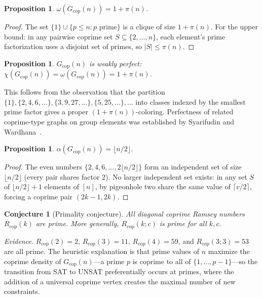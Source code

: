 \documentclass[11pt]{article}
\theoremstyle{plain}
\newtheorem{proposition}[theorem]{Proposition}
\newtheorem{conjecture}[theorem]{Conjecture}
\theoremstyle{definition}
\newcommand{\Rcop}{R_{\mathrm{cop}}}
\newcommand{\Gcop}{G_{\mathrm{cop}}}
\begin{document}
\begin{proposition}\label{prop:clique}
$\omega(\Gcop(n))=1+\pi(n)$.
\end{proposition}

\begin{proof}
The set $\{1\}\cup\{p\le n:p\text{ prime}\}$ is a clique of size
$1+\pi(n)$. For the upper bound: in any pairwise coprime set
$S\subseteq\{2,\ldots,n\}$, each element's prime factorization uses a
disjoint set of primes, so $|S|\le\pi(n)$.
\end{proof}

\begin{proposition}\label{prop:perfect}
$\Gcop(n)$ is weakly perfect: $\chi(\Gcop(n))=\omega(\Gcop(n))
=1+\pi(n)$.
\end{proposition}

This follows from the observation that the partition
$\{1\},\{2,4,6,\ldots\},\{3,9,27,\ldots\},\{5,25,\ldots\},\ldots$
into classes indexed by the smallest prime factor gives a proper
$(1+\pi(n))$-coloring. Perfectness of related coprime-type graphs on
group elements was established by Syarifudin and
Wardhana~\cite{syarifudin2021}.

\begin{proposition}\label{prop:independence}
$\alpha(\Gcop(n))=\lfloor n/2\rfloor$.
\end{proposition}

\begin{proof}
The even numbers $\{2,4,6,\ldots,2\lfloor n/2\rfloor\}$ form an
independent set of size $\lfloor n/2\rfloor$ (every pair shares factor
$2$). No larger independent set exists: in any set $S$ of $\lfloor
n/2\rfloor+1$ elements of $[n]$, by pigeonhole two share the same value
of $\lceil v/2\rceil$, forcing a coprime pair $(2k-1,2k)$.
\end{proof}

\begin{conjecture}[Primality conjecture]\label{conj:prime}
All diagonal coprime Ramsey numbers $\Rcop(k)$ are prime. More
generally, $\Rcop(k;c)$ is prime for all $k,c$.
\end{conjecture}

\noindent\emph{Evidence.} $\Rcop(2)=2$, $\Rcop(3)=11$, $\Rcop(4)=59$,
and $\Rcop(3;3)=53$ are all prime. The heuristic explanation is that
prime values of $n$ maximize the coprime density of $\Gcop(n)$---a prime
$p$ is coprime to all of $\{1,\ldots,p-1\}$---so the transition from
SAT to UNSAT preferentially occurs at primes, where the addition of a
universal coprime vertex creates the maximal number of new constraints.
\end{document}
